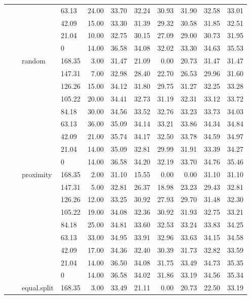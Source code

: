 \begin{longtable}{llllrrrrrrr}
   &  &  & 63.13 & 24.00 & 33.70 & 32.24 & 30.93 & 31.90 & 32.58 & 33.01 \\ 
   &  &  & 42.09 & 15.00 & 33.30 & 31.39 & 29.32 & 30.58 & 31.85 & 32.51 \\ 
   &  &  & 21.04 & 10.00 & 32.75 & 30.15 & 27.09 & 29.00 & 30.73 & 31.95 \\ 
   &  &  & 0 & 14.00 & 36.58 & 34.08 & 32.02 & 33.30 & 34.63 & 35.53 \\ 
   &  & random & 168.35 & 3.00 & 31.47 & 21.09 & 0.00 & 20.73 & 31.47 & 31.47 \\ 
   &  &  & 147.31 & 7.00 & 32.98 & 28.40 & 22.70 & 26.53 & 29.96 & 31.60 \\ 
   &  &  & 126.26 & 15.00 & 34.12 & 31.80 & 29.75 & 31.27 & 32.25 & 33.28 \\ 
   &  &  & 105.22 & 20.00 & 34.41 & 32.73 & 31.19 & 32.31 & 33.12 & 33.72 \\ 
   &  &  & 84.18 & 30.00 & 34.56 & 33.52 & 32.76 & 33.23 & 33.73 & 34.03 \\ 
   &  &  & 63.13 & 36.00 & 35.09 & 34.14 & 33.21 & 33.86 & 34.34 & 34.84 \\ 
   &  &  & 42.09 & 21.00 & 35.74 & 34.17 & 32.50 & 33.78 & 34.59 & 34.97 \\ 
   &  &  & 21.04 & 14.00 & 35.09 & 32.81 & 29.99 & 31.91 & 33.39 & 34.27 \\ 
   &  &  & 0 & 14.00 & 36.58 & 34.20 & 32.19 & 33.70 & 34.76 & 35.46 \\ 
   &  & proximity & 168.35 & 2.00 & 31.10 & 15.55 & 0.00 & 0.00 & 31.10 & 31.10 \\ 
   &  &  & 147.31 & 5.00 & 32.81 & 26.37 & 18.98 & 23.23 & 29.43 & 32.81 \\ 
   &  &  & 126.26 & 12.00 & 33.25 & 30.92 & 27.93 & 29.70 & 31.48 & 32.30 \\ 
   &  &  & 105.22 & 19.00 & 34.08 & 32.36 & 30.92 & 31.93 & 32.75 & 33.21 \\ 
   &  &  & 84.18 & 25.00 & 34.81 & 33.60 & 32.53 & 33.24 & 33.83 & 34.25 \\ 
   &  &  & 63.13 & 33.00 & 34.95 & 33.91 & 32.96 & 33.63 & 34.15 & 34.58 \\ 
   &  &  & 42.09 & 17.00 & 34.36 & 32.40 & 30.39 & 31.73 & 32.82 & 33.59 \\ 
   &  &  & 21.04 & 14.00 & 36.50 & 34.08 & 31.75 & 33.49 & 34.73 & 35.35 \\ 
   &  &  & 0 & 14.00 & 36.58 & 34.02 & 31.86 & 33.19 & 34.56 & 35.34 \\ 
   &  & equal.split & 168.35 & 3.00 & 33.49 & 21.11 & 0.00 & 20.73 & 22.50 & 33.19 \\ 

\end{longtable}
